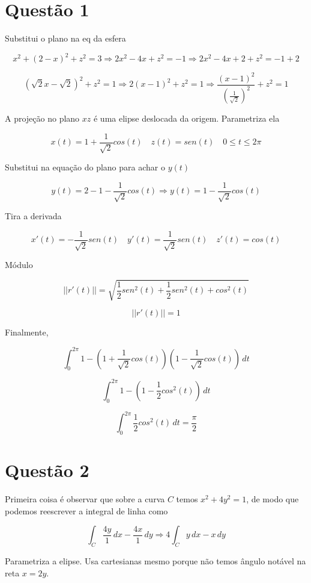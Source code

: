 \section*{Questão 1}

Substitui o plano na eq da esfera

\[ x^2 + (2 - x)^2 + z^2 = 3 \Longrightarrow 2x^2 - 4x + z^2 = -1 \Longrightarrow 2x^2 - 4x + 2 + z^2 = -1 + 2 \]

\[ (\sqrt{2}x - \sqrt{2})^2 + z^2 = 1 \Longrightarrow 2(x - 1)^2 + z^2 = 1 \Longrightarrow \frac{(x - 1)^2}{\left(\frac{1}{\sqrt{2}}\right)^2 }  + z^2 = 1\]

A projeção no plano $xz$ é uma elipse deslocada da origem. Parametriza ela 

\[ x(t) = 1 + \frac{1}{\sqrt{2}}cos(t) \quad z(t) = sen(t) \quad 0 \leq t \leq 2\pi \]

Substitui na equação do plano para achar o $y(t)$

\[ y(t) = 2 - 1 - \frac{1}{\sqrt{2}}cos(t) \Longrightarrow y(t) = 1 - \frac{1}{\sqrt{2}}cos(t) \]

Tira a derivada 

\[ x'(t) = -\frac{1}{\sqrt{2}}sen(t) \quad y'(t) = \frac{1}{\sqrt{2}}sen(t) \quad z'(t) = cos(t)  \]

Módulo 

\[ || r'(t) || = \sqrt{\frac{1}{2}sen^2(t) + \frac{1}{2}sen^2(t) + cos^2(t)} \]

\[ || r'(t) || = 1 \]

Finalmente,

\[ \int_0^{2\pi} 1 - \left(1 + \frac{1}{\sqrt{2}}cos(t)\right)\left(1 - \frac{1}{\sqrt{2}}cos(t)\right) \, dt  \]

\[ \int_0^{2\pi} 1 - \left(1 - \frac{1}{2}cos^2(t)\right) \, dt  \]

\[ \boxed{\int_0^{2\pi} \frac{1}{2}cos^2(t) \, dt = \frac{\pi}{2}}  \]


\section*{Questão 2}

Primeira coisa é observar que sobre a curva $C$ temos $x^2 + 4y^2 = 1$, de modo que 
podemos reescrever a integral de linha como 

\[ \int_C \frac{4y}{1} \, dx - \frac{4x}{1} \, dy \Longrightarrow 4 \int_C y \, dx - x \, dy \]

Parametriza a elipse. Usa cartesianas mesmo porque não temos ângulo notável na reta $x = 2y$.

